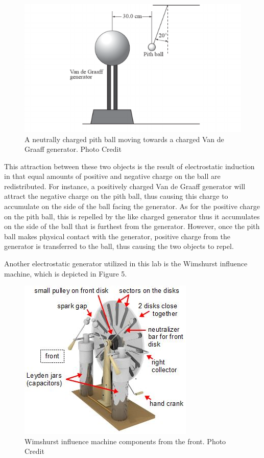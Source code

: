 \documentclass[12pt]{amsart}
\begin{document}
\begin{figure}[h]
	\includegraphics[width=\smallgraph,scale=0.01]{Pith.png}
	\caption{A neutrally charged pith ball moving towards a charged Van de Graaff generator. Photo Credit \cite{dickie}}
	\label{Pith}
\end{figure} 

\indent This attraction between these two objects is the result of electrostatic induction in that equal amounts of positive and negative charge on the ball are redistributed. For instance, a positively charged Van de Graaff generator will attract the negative charge on the pith ball, thus causing this charge to accumulate on the side of the ball facing the generator. As for the positive charge on the pith ball, this is repelled by the like charged generator thus it accumulates on the side of the ball that is furthest from the generator. However, once the pith ball makes physical contact with the generator, positive charge from the generator is transferred to the ball, thus causing the two objects to repel. 

Another electrostatic generator utilized in this lab is the Wimshurst influence machine, which is depicted in Figure 5. \\
\begin{figure}[h]
	\includegraphics[width=\smallgraph,scale=0.01]{Wim.png}
	\caption{Wimshurst influence machine components from the front. Photo Credit \cite{Wim}}
	\label{Wim}
\end{figure} 
\end{document}
